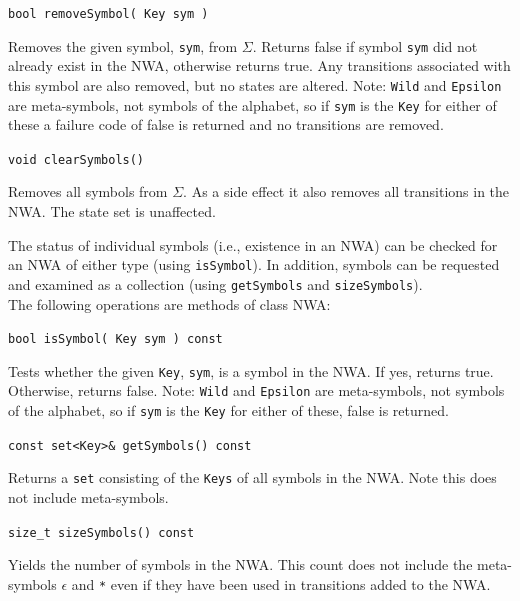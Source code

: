 \documentclass{llncs}
\begin{document}
\begin{description}

  \item\texttt{bool removeSymbol( Key sym )} \nopagebreak

    Removes the given symbol, \texttt{sym}, from $\Sigma$.  Returns false if
    symbol \texttt{sym} did not already exist in the NWA, otherwise returns
    true.  Any transitions associated with this symbol are also removed, but
    no states are altered.  Note: \texttt{Wild} and \texttt{Epsilon} are
    meta-symbols, not symbols of the alphabet, so if \texttt{sym} is the
    \texttt{Key} for either of these a failure code of false is returned and
    no transitions are removed.

  \item\texttt{void clearSymbols()} \nopagebreak

    Removes all symbols from $\Sigma$.  As a side effect it also removes all
    transitions in the NWA.  The state set is unaffected. \\

\end{description}

The status of individual symbols (i.e., existence in an NWA) can be checked
for an NWA of either type (using \texttt{isSymbol}).  In addition, symbols
can be requested and examined as a collection (using \texttt{getSymbols} and
\texttt{sizeSymbols}). \\

\noindent The following operations are methods of class NWA:

\begin{description}

  \item\texttt{bool isSymbol( Key sym ) const} \nopagebreak

    Tests whether the given \texttt{Key}, \texttt{sym}, is a symbol in the
    NWA.  If yes, returns true.  Otherwise, returns false.  Note:
    \texttt{Wild} and \texttt{Epsilon} are meta-symbols, not symbols of the
    alphabet, so if \texttt{sym} is the \texttt{Key} for either of these,
    false is returned.

  \item\texttt{const set<Key>\& getSymbols() const} \nopagebreak

    Returns a \texttt{set} consisting of the \texttt{Keys} of all symbols in
    the NWA.  Note this does not include meta-symbols.

  \item\texttt{size\_t sizeSymbols() const} \nopagebreak

    Yields the number of symbols in the NWA.  This count does not include the
    meta-symbols \texttt{$\epsilon$} and \texttt{*} even if they have been
    used in transitions added to the NWA. \\

\end{description}
\end{document}
